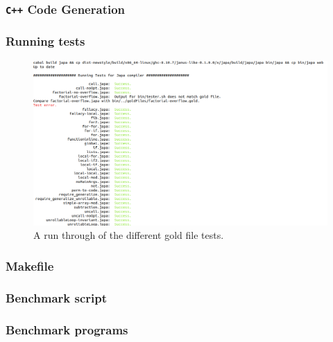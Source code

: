 \subsubsection{\texttt{C++} Code Generation}


\subsubsection{Running tests}

\begin{figure}
    \centering
    \includegraphics{imgs/testrun.png}
    \caption{A run through of the different gold file tests.}
    \label{fig:testrun}
\end{figure}

\subsubsection{Makefile}


\subsubsection{Benchmark script}


\subsubsection{Benchmark programs} \label{sec:benchmark-programs}



